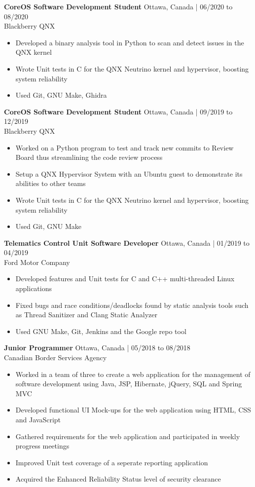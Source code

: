 \documentclass[10pt]{article}
\begin{document}
\textbf{CoreOS Software Development Student} \hfill Ottawa, Canada | 06/2020 to 08/2020 \\
Blackberry QNX
\begin{itemize}
    \item Developed a binary analysis tool in Python to scan and detect issues in the QNX kernel
    \item Wrote Unit tests in C for the QNX Neutrino kernel and hypervisor, boosting system reliability
    \item Used Git, GNU Make, Ghidra 
\end{itemize}

\textbf{CoreOS Software Development Student} \hfill Ottawa, Canada | 09/2019 to 12/2019 \\
Blackberry QNX
\begin{itemize}
    \item Worked on a Python program to test and track new commits to Review Board thus streamlining the code review process
    \item Setup a QNX Hypervisor System with an Ubuntu guest to demonstrate its abilities to other teams
    \item Wrote Unit tests in C for the QNX Neutrino kernel and hypervisor, boosting system reliability
    \item Used Git, GNU Make
\end{itemize}

\textbf{Telematics Control Unit Software Developer} \hfill Ottawa, Canada | 01/2019 to 04/2019 \\
Ford Motor Company
\begin{itemize}[noitemsep]
    \item Developed features and Unit tests for C and C++ multi-threaded Linux applications
    \item Fixed bugs and race conditions/deadlocks found by static analysis tools such as Thread Sanitizer and Clang Static Analyzer
    \item Used GNU Make, Git, Jenkins and the Google repo tool
\end{itemize}

\textbf{Junior Programmer} \hfill Ottawa, Canada | 05/2018 to 08/2018 \\
Canadian Border Services Agency
\begin{itemize}
    \item Worked in a team of three to create a web application for the management of software development using Java, JSP, Hibernate, jQuery, SQL and Spring MVC
    \item Developed functional UI Mock-ups for the web application using HTML, CSS and JavaScript
    \item Gathered requirements for the web application and participated in weekly progress meetings
    \item Improved Unit test coverage of a seperate reporting application
    \item Acquired the Enhanced Reliability Status level of security clearance
\end{itemize}
\end{document}
